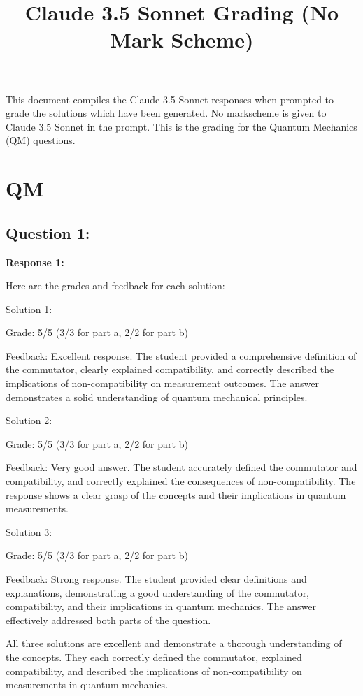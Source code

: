 \documentclass[a4paper,11pt]{article}
\title{Claude 3.5 Sonnet Grading (No Mark Scheme)}
\begin{document}
\maketitle
This document compiles the Claude 3.5 Sonnet responses when prompted to grade the solutions which have been generated. No markscheme is given to Claude 3.5 Sonnet in the prompt. This is the grading for the Quantum Mechanics (QM) questions. 

\section{QM}
\subsection*{Question 1:}

\textbf{Response 1:}

Here are the grades and feedback for each solution:

Solution 1:

Grade: 5/5 (3/3 for part a, 2/2 for part b)

Feedback: Excellent response. The student provided a comprehensive definition of the commutator, clearly explained compatibility, and correctly described the implications of non-compatibility on measurement outcomes. The answer demonstrates a solid understanding of quantum mechanical principles.

Solution 2:

Grade: 5/5 (3/3 for part a, 2/2 for part b)

Feedback: Very good answer. The student accurately defined the commutator and compatibility, and correctly explained the consequences of non-compatibility. The response shows a clear grasp of the concepts and their implications in quantum measurements.

Solution 3:

Grade: 5/5 (3/3 for part a, 2/2 for part b)

Feedback: Strong response. The student provided clear definitions and explanations, demonstrating a good understanding of the commutator, compatibility, and their implications in quantum mechanics. The answer effectively addressed both parts of the question.

All three solutions are excellent and demonstrate a thorough understanding of the concepts. They each correctly defined the commutator, explained compatibility, and described the implications of non-compatibility on measurements in quantum mechanics.
\end{document}

